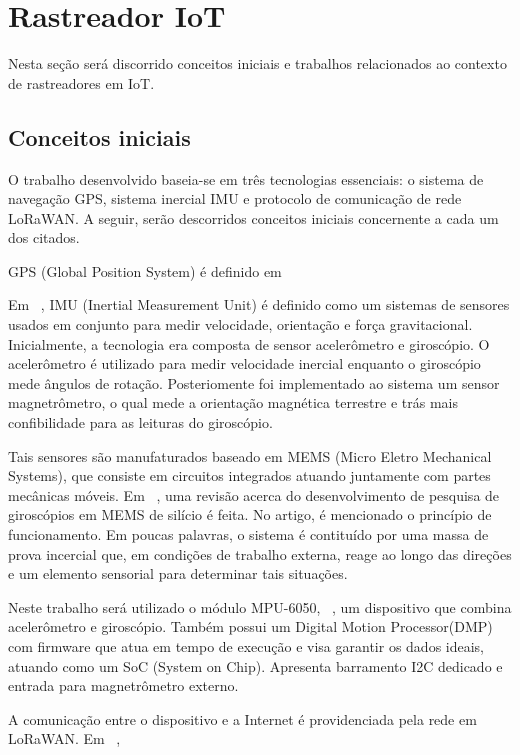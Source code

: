 \section{Rastreador IoT}
Nesta seção será discorrido conceitos iniciais e trabalhos relacionados ao contexto de rastreadores em IoT.

\subsection{Conceitos iniciais}
O trabalho desenvolvido baseia-se em três tecnologias essenciais: o sistema de navegação GPS, sistema inercial IMU e protocolo de comunicação de rede LoRaWAN. A seguir, serão descorridos conceitos iniciais concernente a cada um dos citados.

GPS (Global Position System) é definido em 

Em ~\cite{Ahmad2013}, IMU (Inertial Measurement Unit) é definido como um sistemas de sensores usados em conjunto para medir velocidade, orientação e força gravitacional. Inicialmente, a tecnologia era composta de sensor acelerômetro e giroscópio. O acelerômetro é utilizado para medir velocidade inercial enquanto o giroscópio mede ângulos de rotação. Posteriomente foi implementado ao sistema um sensor magnetrômetro, o qual mede a orientação magnética terrestre e trás mais confibilidade para as leituras do giroscópio.

Tais sensores são manufaturados baseado em MEMS (Micro Eletro Mechanical Systems), que consiste em circuitos integrados atuando juntamente com partes mecânicas móveis. Em ~\cite{Zhanshe2015}, uma revisão acerca do desenvolvimento de pesquisa de giroscópios em MEMS de silício é feita. No artigo, é mencionado o princípio de funcionamento. Em poucas palavras, o sistema é contituído por uma massa de prova incercial que, em condições de trabalho externa, reage ao longo das direções e um elemento sensorial para determinar tais situações.

Neste trabalho será utilizado o módulo MPU-6050, ~\cite{MPUDatasheet}, um dispositivo que combina acelerômetro e giroscópio. Também possui um Digital Motion Processor\texttrademark (DMP) com firmware que atua em tempo de execução e visa garantir os dados ideais, atuando como um SoC (System on Chip). Apresenta barramento I2C dedicado e entrada para magnetrômetro externo.

A comunicação entre o dispositivo e a Internet é providenciada pela rede em LoRaWAN. Em ~\cite{Pastorio2021}, 

